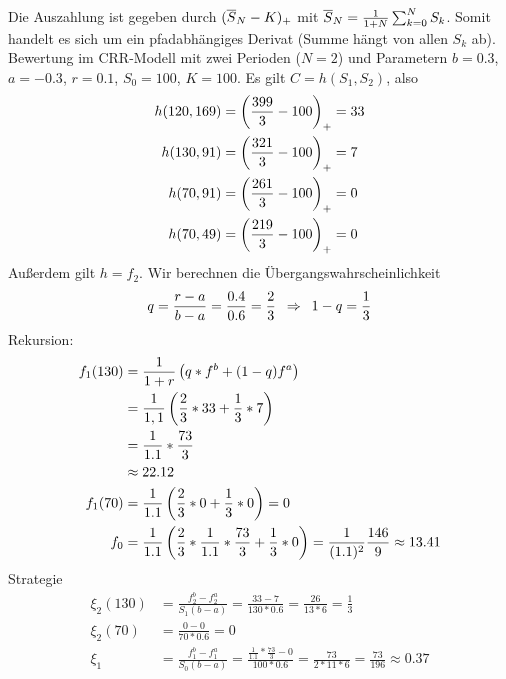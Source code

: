 \begin{*beispiel}
	Die Auszahlung ist gegeben durch $(\overline{S}_N - K)_+$ mit $\overline{S}_N = \frac{1}{1+N} \sum_{k=0}^{N} S_k$. Somit handelt es sich um ein pfadabhängiges Derivat (Summe hängt von allen $S_k$ ab). 
	Bewertung im CRR-Modell mit zwei Perioden ($N=2$) und Parametern $b = 0.3$, $a = -0.3$, $r=0.1$, $S_0 = 100$, $K=100$.
		Es gilt $C = h(S_1, S_2)$, also
	\begin{align*}
		h(120,169) &= \left( \frac{399}{3} - 100 \right)_+ = 33 \\
		h(130,91)  &= \left( \frac{321}{3} - 100 \right)_+ = 7 \\
		h(70, 91)  &= \left( \frac{261}{3} - 100 \right)_+ = 0 \\
		h(70, 49)  &= \left( \frac{219}{3} - 100 \right)_+ = 0 \\
	\end{align*} 
	Außerdem gilt $h = f_2$. Wir berechnen die Übergangswahrscheinlichkeit
	\begin{equation*}
		q = \frac{r-a}{b-a} = \frac{0.4}{0.6} = \frac{2}{3} \enskip \Rightarrow \enskip 1 - q = \frac{1}{3}
	\end{equation*}
	Rekursion:
	\begin{align*}
		f_1(130) &= \frac{1}{1+r} \left( q * f^b + (1-q) f^a \right) \\
		&= \frac{1}{1,1} \left( \frac{2}{3} * 33 + \frac{1}{3} * 7 \right) \\
		&= \frac{1}{1.1} * \frac{73}{3} \\
		&\approx 22.12 \\
		f_1(70) &= \frac{1}{1.1} \left( \frac{2}{3} * 0 + \frac{1}{3} * 0 \right) = 0 \\
		f_0 &= \frac{1}{1.1} \left( \frac{2}{3} * \frac{1}{1.1} * \frac{73}{3} + \frac{1}{3} * 0 \right) = \frac{1}{(1.1)^2} \frac{146}{9} \approx 13.41 
	\end{align*}
	Strategie
	\begin{align*}
		\xi_2(130) &= \frac{f_2^b - f_2^a}{S_1 (b-a)} = \frac{33 - 7}{130 * 0.6} = \frac{26}{13*6} = \frac{1}{3} \\
		\xi_2(70) &= \frac{0-0}{70 * 0.6} = 0 \\
		\xi_1 &= \frac{f_1^b - f_1^a}{S_0 (b-a)} = \frac{\frac{1}{1.1} * \frac{73}{3} - 0}{100 * 0.6} = \frac{73}{2*11*6} = \frac{73}{196} \approx 0.37
	\end{align*}
\end{*beispiel}


